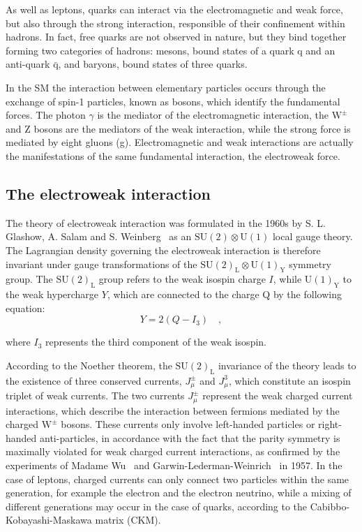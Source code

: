 As well as leptons, quarks can interact via the electromagnetic and weak force, but also through the strong interaction, responsible of their confinement within hadrons. In fact, free quarks are not observed in nature, but they bind together forming two categories of hadrons: mesons, bound states of a quark q and an anti-quark $\mathrm{\bar{q}}$, and baryons, bound states of three quarks.

In the SM the interaction between elementary particles occurs through the exchange of spin-1 particles, known as bosons, which identify the fundamental forces. The photon $\gamma$ is the mediator of the electromagnetic interaction, the $\mathrm{W^{\pm}}$ and Z bosons are the mediators of the weak interaction, while the strong force is mediated by eight gluons (g). Electromagnetic and weak interactions are actually the manifestations of the same fundamental interaction, the electroweak force.


\subsection{The electroweak interaction}

The theory of electroweak interaction was formulated in the 1960s by S. L. Glashow, A. Salam and S. Weinberg~\cite{Glashow:1961tr,Weinberg:1967tq} as an $\mathrm{SU(2) \otimes U(1)}$ local gauge theory.
The Lagrangian density governing the electroweak interaction is therefore invariant under gauge transformations of the $\mathrm{SU(2)_L\otimes U(1)_Y}$ symmetry group. The $\mathrm{SU(2)_L}$ group refers to the weak isospin charge $I$, while $\mathrm{U(1)_Y}$ to the weak hypercharge $Y$, which are connected to the charge Q by the following equation:
\begin{equation}
Y = 2(Q - I_3) \quad,
\end{equation}

\noindent where $I_3$ represents the third component of the weak isospin. 

According to the Noether theorem, the $\mathrm{SU(2)_L}$ invariance of the theory leads to the existence of three conserved currents, $J_\mu^\pm$ and $J_\mu^3$, which constitute an isospin triplet of weak currents. 
The two currents $J_\mu^\pm$ represent the weak charged current interactions, which describe the interaction between fermions mediated by the charged $\mathrm{W^\pm}$ bosons. These currents only involve left-handed particles or right-handed anti-particles, in accordance with the fact that the parity symmetry is maximally violated for weak charged current interactions, as confirmed by the experiments of Madame Wu~\cite{Wu:1957my} and Garwin-Lederman-Weinrich~\cite{Garwin:1957hc} in 1957. In the case of leptons, charged currents can only connect two particles within the same generation, for example the electron and the electron neutrino, while a mixing of different generations may occur in the case of quarks, according to the Cabibbo-Kobayashi-Maskawa matrix (CKM).

